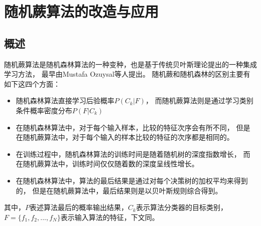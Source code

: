 \chapter{随机蕨算法的改造与应用}

\section{概述}
随机蕨算法是随机森林算法的一种变种，也是基于传统贝叶斯理论提出的一种集成学习方法，
最早由Mustafa Ozuysal等人提出\cite{ozuysal2007fast}。
随机蕨和随机森林的区别主要有如下这四个方面：
\begin{itemize}
\item
随机森林算法直接学习后验概率$P(C_k|F)$，
而随机蕨算法则是通过学习类别条件概率密度分布$P(F|C_k)$
\item
在随机森林算法中，对于每个输入样本，比较的特征次序会有所不同，
但是在随机蕨算法中，对于每个输入的样本比较的特征的次序都是相同的。
\item
在训练过程中，随机森林算法的训练时间是随着随机树的深度指数增长，
而在随机蕨算法中，训练时间仅仅随着数的深度呈线性增长。
\item
在随机森林算法中，算法的最后结果是通过对每个决策树的加权平均来得到的，
但是在随机蕨算法中，最后结果则是以贝叶斯规则综合得到。
\end{itemize}
其中，$P$表述算法最后的概率输出结果，$C_k$表示算法分类器的目标类别，
$F=\{f_1,f_2,...,f_N\}$表示输入算法的特征，下文同。

